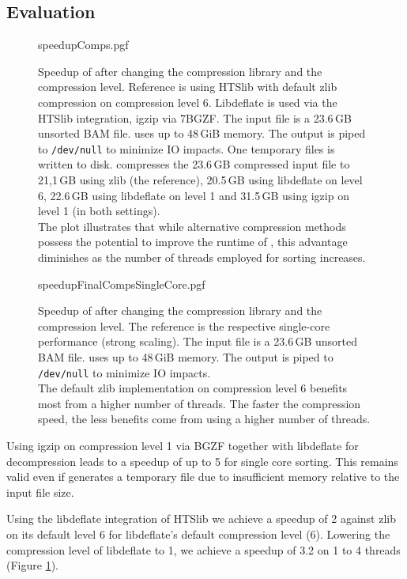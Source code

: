 \subsection{Evaluation}
\begin{figure}[t]
        {speedupComps.pgf}
    \caption{Speedup of \sort after changing the compression library and the compression level. Reference is \sort using HTSlib with default zlib compression on compression level 6. Libdeflate is used via the HTSlib integration, igzip via 7BGZF. The input file is a 23.6\,GB unsorted BAM file. \sort uses up to 48\,GiB memory. The output is piped to \texttt{/dev/null} to minimize IO impacts. One temporary files is written to disk. \sort compresses the 23.6\,GB compressed input file to 21,1\,GB using zlib (the reference), 20.5\,GB using libdeflate on level 6, 22.6\,GB using libdeflate on level 1 and 31.5\,GB using igzip on level 1 (in both settings). \parents \threads \points\\
    The plot illustrates that while alternative compression methods possess the potential to improve the runtime of \sort, this advantage diminishes as the number of threads employed for sorting increases.}
    \label{fig:speedupCompression}
\end{figure}
\begin{figure}[!h]
        {speedupFinalCompsSingleCore.pgf}
    \caption{Speedup of \sort after changing the compression library and the compression level. The reference is the respective single-core performance (strong scaling). The input file is a 23.6\,GB unsorted BAM file. \sort uses up to 48\,GiB memory. The output is piped to \texttt{/dev/null} to minimize IO impacts. \parents \threads \points\\
    The default zlib implementation on compression level 6 benefits most from a higher number of threads. The faster the compression speed, the less benefits come from using a higher number of threads.}
    \label{fig:speedupSingle}
\end{figure}
Using igzip on compression level 1 via BGZF together with libdeflate for decompression leads to a speedup of up to 5 for single core sorting. This remains valid even if \sort generates a temporary file due to insufficient memory relative to the input file size.

Using the libdeflate integration of HTSlib we achieve a speedup of 2 against zlib on its default level 6 for libdeflate's default compression level (6). Lowering the compression level of libdeflate to 1, we achieve a speedup of 3.2 on 1 to 4 threads (Figure \ref{fig:speedupCompression}).

